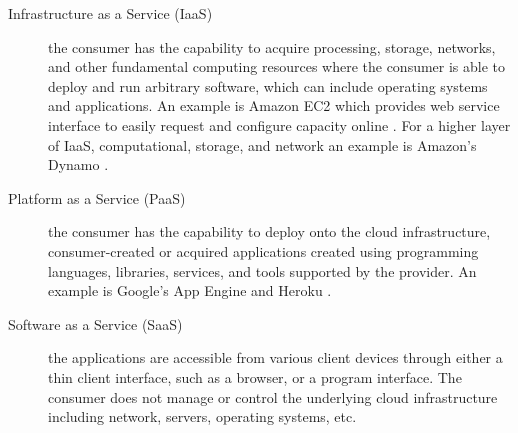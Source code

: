 \begin{description}
	\item [Infrastructure as a Service (IaaS)] the consumer has the capability to acquire processing, storage, networks, and other fundamental computing resources where the consumer is able to deploy and run arbitrary software, which can include operating systems and applications. An example is Amazon EC2 which provides web service interface to easily request and configure capacity online \cite{ec2}. For a higher layer of IaaS, computational, storage, and network an example is Amazon’s Dynamo \cite{DeCandia2007}.\\

	\item [Platform as a Service (PaaS)] the consumer has the capability to deploy onto the cloud infrastructure, consumer-created or acquired applications created using programming languages, libraries, services, and tools supported by the provider. An example is Google’s App Engine \cite{GoogleAppEngine} and Heroku \cite{Heroku}.\\

	\item [Software as a Service (SaaS)] the applications are accessible from various client devices through either a thin client interface, such as a browser, or a program interface. The consumer does not manage or control the underlying cloud infrastructure including network, servers, operating systems, etc.

\end{description}



